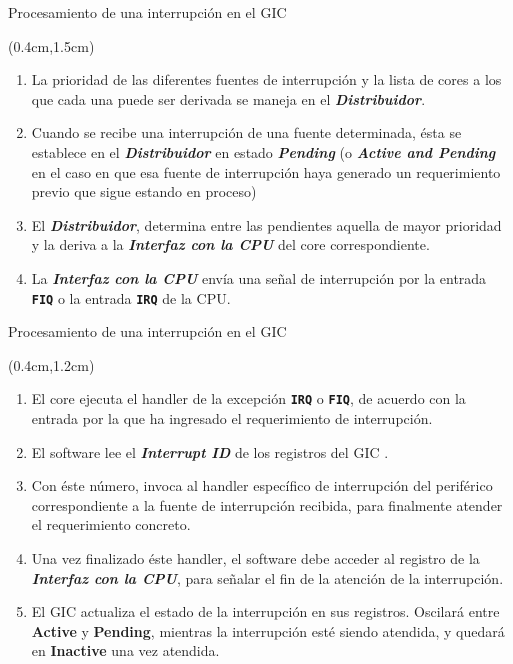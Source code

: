 \documentclass[usenames,table,xcolor={x11names},aspectratio=169]{beamer}
\newcounter{saveenumi}
\newcommand{\seti}{\setcounter{saveenumi}{\value{enumi}}}
\newcommand{\conti}{\setcounter{enumi}{\value{saveenumi}}}
\begin{document}
\begin{frame}[t]{Procesamiento de una interrupción en el GIC}
 \begin{textblock*}{\textwidth}(0.4cm,1.5cm)
  \begin{enumerate}[<+(1)->]\justifying \parskip 0.3cm \seti
   \item La prioridad de las diferentes fuentes de interrupción y la lista de cores a los que cada una puede ser derivada se maneja en el \textbf{\textit{Distribuidor}}.
   \item Cuando se recibe una interrupción de una fuente determinada, ésta se establece en el \textbf{\textit{Distribuidor}} en estado \textbf{\textit{\color{Blue3}Pending}} (o \textbf{\textit{\color{Blue4}Active and Pending}} en el caso en que esa fuente de interrupción haya generado un requerimiento previo que sigue estando en proceso)
   \item El \textbf{\textit{Distribuidor}}, determina entre las pendientes aquella de mayor prioridad y la deriva a la \textit{\textbf{Interfaz con la CPU}} del core correspondiente.
   \item La \textit{\textbf{Interfaz con la CPU}} envía una señal de interrupción por la entrada \texttt{\textbf{FIQ}} o la entrada \texttt{\textbf{IRQ}} de la CPU.
   \seti
  \end{enumerate}
 \end{textblock*}
\end{frame}

\begin{frame}[t]{Procesamiento de una interrupción en el GIC}
 \begin{textblock*}{\textwidth}(0.4cm,1.2cm)
  \begin{enumerate}[<+->]\justifying \parskip 0.15cm \conti
   \item El core ejecuta el handler de la excepción \textbf{\texttt{IRQ}} o \textbf{\texttt{FIQ}}, de acuerdo con la entrada por la que ha ingresado el requerimiento de interrupción.
   \item El software lee el \textbf{\textit{Interrupt ID}} de los registros del GIC .
   \item Con éste número, invoca al handler específico de interrupción del periférico correspondiente a la fuente de interrupción recibida, para finalmente atender el requerimiento concreto.
   \item Una vez finalizado éste handler, el software debe acceder al registro de la \textit{\textbf{Interfaz con la CPU}},  para señalar el fin de la atención de la interrupción.
   \item El GIC actualiza el estado de la interrupción en sus registros. Oscilará entre \textbf{\color{Blue2}Active} y \textbf{\color{Blue3}Pending}, mientras la interrupción esté siendo atendida, y quedará en \textbf{\color{Blue1}Inactive} una vez atendida.
  \end{enumerate}
 \end{textblock*}
\end{frame}
\end{document}
